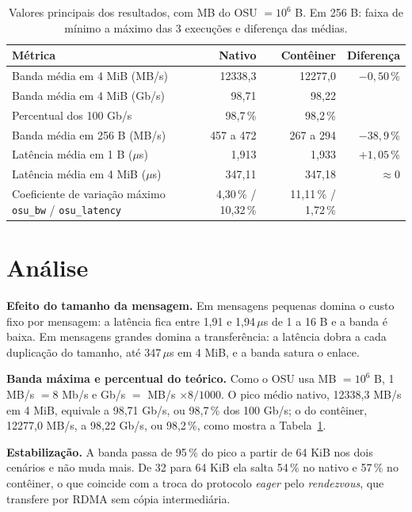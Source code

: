 \documentclass[Portugues]{ic-tese-v3}
\begin{document}
\begin{table}[!htb]
\centering\footnotesize
\renewcommand{\arraystretch}{1.05}
\begin{tabular}{|l|r|r|r|}
\hline
\textbf{Métrica} & \textbf{Nativo} & \textbf{Contêiner} & \textbf{Diferença} \\
\hline\hline
Banda média em 4 MiB (MB/s) & 12338,3 & 12277,0 & $-0{,}50$\,\% \\ \hline
Banda média em 4 MiB (Gb/s) & 98,71 & 98,22 & \\ \hline
Percentual dos 100 Gb/s & 98,7\,\% & 98,2\,\% & \\ \hline
Banda média em 256 B (MB/s) & 457 a 472 & 267 a 294 & $-38{,}9$\,\% \\ \hline
Latência média em 1 B ($\mu$s) & 1,913 & 1,933 & $+1{,}05$\,\% \\ \hline
Latência média em 4 MiB ($\mu$s) & 347,11 & 347,18 & $\approx 0$ \\ \hline
Coeficiente de variação máximo \texttt{osu\_bw} / \texttt{osu\_latency} & 4,30\,\% / 10,32\,\% & 11,11\,\% / 1,72\,\% & \\ \hline
\end{tabular}
\caption{Valores principais dos resultados, com MB do OSU $=10^6$ B. Em 256 B: faixa de mínimo a máximo das 3 execuções e diferença das médias.}
\label{tab:res}
\end{table}

\section{Análise}
\textbf{Efeito do tamanho da mensagem.} Em mensagens pequenas domina o custo fixo por mensagem: a latência fica entre 1,91 e 1,94\,$\mu$s de 1 a 16 B e a banda é baixa. Em mensagens grandes domina a transferência: a latência dobra a cada duplicação do tamanho, até 347\,$\mu$s em 4 MiB, e a banda satura o enlace.

\textbf{Banda máxima e percentual do teórico.} Como o OSU usa MB $=10^6$ B, 1 MB/s $= 8$ Mb/s e Gb/s $=$ MB/s $\times 8/1000$. O pico médio nativo, 12338,3 MB/s em 4 MiB, equivale a 98,71 Gb/s, ou 98,7\,\% dos 100 Gb/s; o do contêiner, 12277,0 MB/s, a 98,22 Gb/s, ou 98,2\,\%, como mostra a Tabela~\ref{tab:res}.

\textbf{Estabilização.} A banda passa de 95\,\% do pico a partir de 64 KiB nos dois cenários e não muda mais. De 32 para 64 KiB ela salta 54\,\% no nativo e 57\,\% no contêiner, o que coincide com a troca do protocolo \emph{eager} pelo \emph{rendezvous}, que transfere por RDMA sem cópia intermediária.
\end{document}

